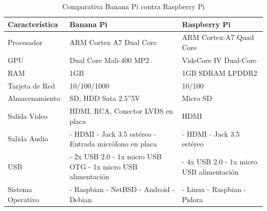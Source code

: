 \begin{table}[!hbt]
	 \begin{tabular}{|M{3.0cm}|M{4.5cm}|M{4.5cm}|}
	\hline
	\textbf{Característica} & \textbf{Banana Pi} & \textbf{Raspberry Pi} \\ 
	\hline
 	Procesador & ARM Cortex A7 Dual Core & ARM Cortex-A7 Quad Core \\
 	\hline
    GPU & Dual Core Mali-400 MP2 & VideCore IV Dual-Core\\
    \hline
    RAM & 1GB & 1GB SDRAM LPDDR2 \\
	\hline
	Tarjeta de Red & 10/100/1000 & 10/100\\
	\hline
	Almacenamiento & SD, HDD Sata 2.5''5V & Micro SD\\
	\hline
	Salida Video & HDMI, RCA, Conector LVDS en placa & HDMI\\
    \hline
    Salida Audio 
    & 
    \newline - HDMI 
    \newline - Jack 3.5 estéreo
    \newline - Entrada micrófono en placa 
    & 
    \newline - HDMI
    \newline - Jack 3.5 estéreo \\
    \hline
    USB & 
    \newline - 2x USB 2.0 
    \newline - 1x micro USB OTG
    \newline - 1x micro USB alimentación 
    & 
    \newline - 4x USB 2.0
    \newline - 1x micro USB alimentación \\
    \hline
    Sistema Operativo 
    & 
    \newline - Raspbian
    \newline - NetBSD
    \newline - Android
    \newline - Debian 
    &
    \newline - Linux
    \newline - Raspbian
    \newline - Pidora \\
    \hline
	\end{tabular}
	\caption{Comparativa Banana Pi contra Raspberry Pi}
\end{table}

